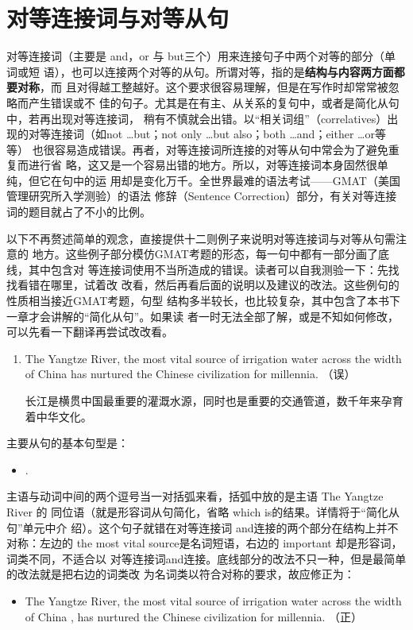 \chapter{对等连接词与对等从句}

对等连接词（主要是 and，or 与 but三个）用来连接句子中两个对等的部分（单词或短
语），也可以连接两个对等的从句。所谓对等，指的是\textbf{结构与内容两方面都要对称}，而
且对得越工整越好。这个要求很容易理解，但是在写作时却常常被忽略而产生错误或不
佳的句子。尤其是在有主、从关系的复句中，或者是简化从句中，若再出现对等连接词，
稍有不慎就会出错。以“相关词组”（correlatives）出现的对等连接词（如not
\ldots but；not only \ldots but also；both \ldots and；either \ldots or等等）
也很容易造成错误。再者，对等连接词所连接的对等从句中常会为了避免重复而进行省
略，这又是一个容易出错的地方。所以，对等连接词本身固然很单纯，但它在句中的运
用却是变化万千。全世界最难的语法考试——GMAT（美国管理研究所入学测验）的语法
修辞（Sentence Correction）部分，有关对等连接词的题目就占了不小的比例。

以下不再赘述简单的观念，直接提供十二则例子来说明对等连接词与对等从句需注意的
地方。这些例子部分模仿GMAT考题的形态，每一句中都有一部分画了底线，其中包含对
等连接词使用不当所造成的错误。读者可以自我测验一下：先找找看错在哪里，试着改
改看，然后再看后面的说明以及建议的改法。这些例句的性质相当接近GMAT考题，句型
结构多半较长，也比较复杂，其中包含了本书下一章才会讲解的“简化从句”。如果读
者一时无法全部了解，或是不知如何修改，可以先看一下翻译再尝试改改看。

\begin{enumerate}
\item The Yangtze River, the most vital source of irrigation water across the
  width of China  has
  nurtured the Chinese civilization for millennia. （误）


  长江是横贯中国最重要的灌溉水源，同时也是重要的交通管道，数千年来孕育着中华文化。
\end{enumerate}


主要从句的基本句型是：
\begin{itemize}
\item {}  .
\end{itemize}

主语与动词中间的两个逗号当一对括弧来看，括弧中放的是主语 The Yangtze River 的
同位语（就是形容词从句简化，省略 which is的结果。详情将于“简化从句”单元中介
绍）。这个句子就错在对等连接词 and连接的两个部分在结构上并不对称：左边的 the
most vital source是名词短语，右边的 important 却是形容词，词类不同，不适合以
对等连接词and连接。底线部分的改法不只一种，但是最简单的改法就是把右边的词类改
为名词类以符合对称的要求，故应修正为：
\begin{mybox}
\begin{itemize}
\item The Yangtze River, the most vital source of irrigation water across the
  width of China , has nurtured the
  Chinese civilization for millennia. （正）
\end{itemize}
\end{mybox}


